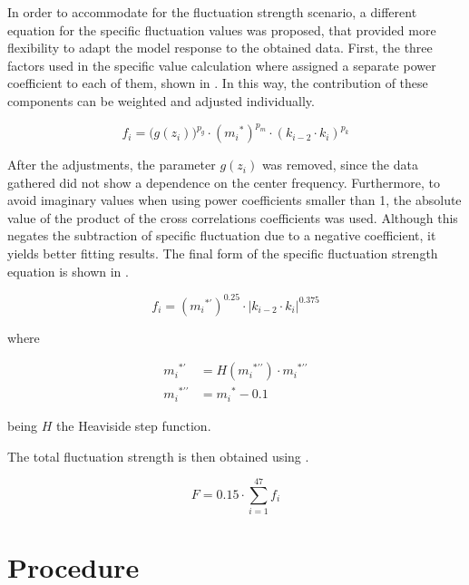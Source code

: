 \documentclass[../main.tex]{subfiles}
\begin{document}
\begin{modelchapter}
In order to accommodate for the fluctuation strength scenario, a different
equation for the specific fluctuation values was proposed, that provided more
flexibility to adapt the model response to the obtained data. First, the three
factors used in the specific value calculation where assigned a separate power
coefficient to each of them, shown in . In this way, the
contribution of these components can be weighted and adjusted individually.

\begin{equation}
  f_i = \big(g(z_i)\big)^{p_g} \cdot ({m_i}^*)^{p_m}
    \cdot (k_{i-2} \cdot k_i)^{p_k}
  \label{eq:fi}
\end{equation}

After the adjustments, the parameter $g(z_i)$ was removed, since the data
gathered did not show a dependence on the center frequency. Furthermore, to
avoid imaginary values when using power coefficients smaller than 1, the
absolute value of the product of the cross correlations coefficients was used.
Although this negates the subtraction of specific fluctuation due to a negative
coefficient, it yields better fitting results. The final form of the specific
fluctuation strength equation is shown in .

\begin{equation}
  f_i = ({m_i}^{*\prime})^{0.25} \cdot |k_{i-2} \cdot k_i|^{0.375}
  \label{eq:fi_final}
\end{equation}

where

\begin{align}
  {m_i}^{*\prime} &= H({m_i}^{*\prime\prime}) \cdot {m_i}^{*\prime\prime}
  \label{eq:md_transformation_1} \\
  {m_i}^{*\prime\prime} &= {m_i}^* - 0.1
  \label{eq:md_transformation_2}
\end{align}

being $H$ the Heaviside step function.

The total fluctuation strength is then obtained using
.

\begin{equation}
  F = 0.15 \cdot \displaystyle\sum_{i=1}^{47} f_i
  \label{eq:total_fluctuation}
\end{equation}

\section{Procedure}


\end{modelchapter}
\end{document}
